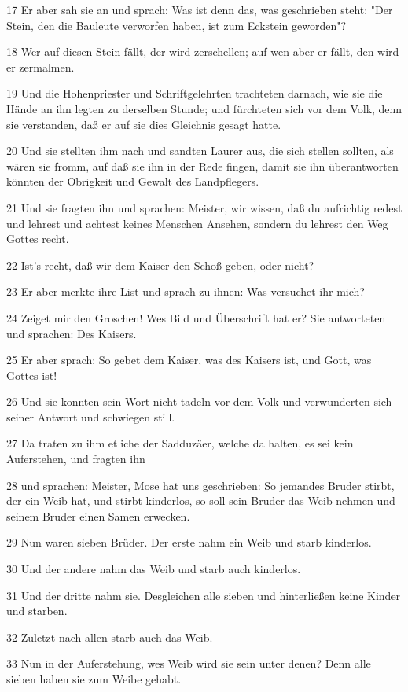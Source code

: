 \par 17 Er aber sah sie an und sprach: Was ist denn das, was geschrieben steht: "Der Stein, den die Bauleute verworfen haben, ist zum Eckstein geworden"?
\par 18 Wer auf diesen Stein fällt, der wird zerschellen; auf wen aber er fällt, den wird er zermalmen.
\par 19 Und die Hohenpriester und Schriftgelehrten trachteten darnach, wie sie die Hände an ihn legten zu derselben Stunde; und fürchteten sich vor dem Volk, denn sie verstanden, daß er auf sie dies Gleichnis gesagt hatte.
\par 20 Und sie stellten ihm nach und sandten Laurer aus, die sich stellen sollten, als wären sie fromm, auf daß sie ihn in der Rede fingen, damit sie ihn überantworten könnten der Obrigkeit und Gewalt des Landpflegers.
\par 21 Und sie fragten ihn und sprachen: Meister, wir wissen, daß du aufrichtig redest und lehrest und achtest keines Menschen Ansehen, sondern du lehrest den Weg Gottes recht.
\par 22 Ist's recht, daß wir dem Kaiser den Schoß geben, oder nicht?
\par 23 Er aber merkte ihre List und sprach zu ihnen: Was versuchet ihr mich?
\par 24 Zeiget mir den Groschen! Wes Bild und Überschrift hat er? Sie antworteten und sprachen: Des Kaisers.
\par 25 Er aber sprach: So gebet dem Kaiser, was des Kaisers ist, und Gott, was Gottes ist!
\par 26 Und sie konnten sein Wort nicht tadeln vor dem Volk und verwunderten sich seiner Antwort und schwiegen still.
\par 27 Da traten zu ihm etliche der Sadduzäer, welche da halten, es sei kein Auferstehen, und fragten ihn
\par 28 und sprachen: Meister, Mose hat uns geschrieben: So jemandes Bruder stirbt, der ein Weib hat, und stirbt kinderlos, so soll sein Bruder das Weib nehmen und seinem Bruder einen Samen erwecken.
\par 29 Nun waren sieben Brüder. Der erste nahm ein Weib und starb kinderlos.
\par 30 Und der andere nahm das Weib und starb auch kinderlos.
\par 31 Und der dritte nahm sie. Desgleichen alle sieben und hinterließen keine Kinder und starben.
\par 32 Zuletzt nach allen starb auch das Weib.
\par 33 Nun in der Auferstehung, wes Weib wird sie sein unter denen? Denn alle sieben haben sie zum Weibe gehabt.
